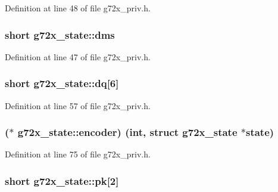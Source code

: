 Definition at line 48 of file g72x\+\_\+priv.\+h.

\subsubsection[{\texorpdfstring{dms}{dms}}]{\setlength{\rightskip}{0pt plus 5cm}short g72x\+\_\+state\+::dms}\hypertarget{structg72x__state_a779d505204749451fdca216900b6d551}{}\label{structg72x__state_a779d505204749451fdca216900b6d551}


Definition at line 47 of file g72x\+\_\+priv.\+h.

\subsubsection[{\texorpdfstring{dq}{dq}}]{\setlength{\rightskip}{0pt plus 5cm}short g72x\+\_\+state\+::dq\mbox{[}6\mbox{]}}\hypertarget{structg72x__state_a6fb589b044f78716df5652a23d46096a}{}\label{structg72x__state_a6fb589b044f78716df5652a23d46096a}


Definition at line 57 of file g72x\+\_\+priv.\+h.

\subsubsection[{\texorpdfstring{encoder}{encoder}}]{($\ast$ g72x\+\_\+state\+::encoder) ({\bf int}, struct {\bf g72x\+\_\+state} $\ast$state)}\hypertarget{structg72x__state_aa42808c5c6a028645b15b6cfcce00f2c}{}\label{structg72x__state_aa42808c5c6a028645b15b6cfcce00f2c}


Definition at line 75 of file g72x\+\_\+priv.\+h.

\subsubsection[{\texorpdfstring{pk}{pk}}]{\setlength{\rightskip}{0pt plus 5cm}short g72x\+\_\+state\+::pk\mbox{[}2\mbox{]}}\hypertarget{structg72x__state_a0f0b967ab4c0f8289d35c4c856546916}{}\label{structg72x__state_a0f0b967ab4c0f8289d35c4c856546916}


